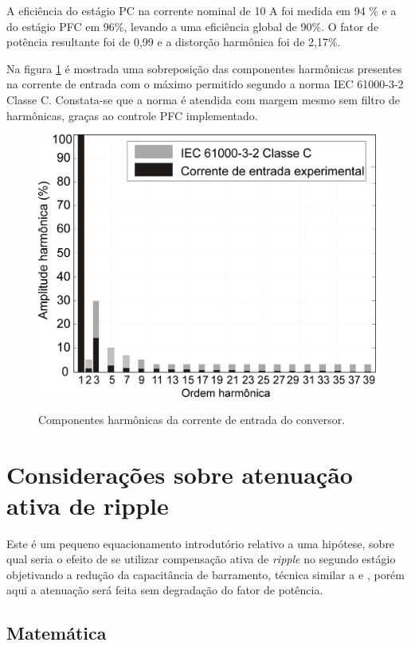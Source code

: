 \documentclass[
        12pt,
        openany, %
        oneside, %
        a4paper,			
        english,			
        brazil
        ]{abntbibufjf}
\begin{document}
A eficiência do estágio PC na corrente nominal de 10 A foi medida em 94 \% e a do estágio PFC em 96\%, levando a uma eficiência global de 90\%. O fator de potência resultante foi de 0,99 e a distorção harmônica foi de 2,17\%.

Na figura \ref{tdh_super} é mostrada uma sobreposição das componentes harmônicas presentes na corrente de entrada com o máximo permitido segundo a norma IEC 61000-3-2 Classe C. Constata-se que a norma é atendida com margem mesmo sem filtro de harmônicas, graças ao controle PFC implementado.

\begin{figure}[!h]
	\centering
	\caption{Componentes harmônicas da corrente de entrada do conversor.}
	\includegraphics[width=0.7\linewidth]{../FIGURAS/Figuras_TFC_Eric/Figuras/iec61000-3-2_controlled_two-stage_pt}
	\label{tdh_super}
\end{figure}


\chapter{Considerações sobre atenuação ativa de ripple}


Este é um pequeno equacionamento introdutório relativo a uma hipótese, sobre qual seria o efeito de se utilizar compensação ativa de \textit{ripple} no segundo estágio objetivando a redução da capacitância de barramento, técnica similar a \cite{guilherme} e \cite{bruno}, porém aqui a atenuação será feita sem degradação do fator de potência.


\section{Matemática}
\end{document}
